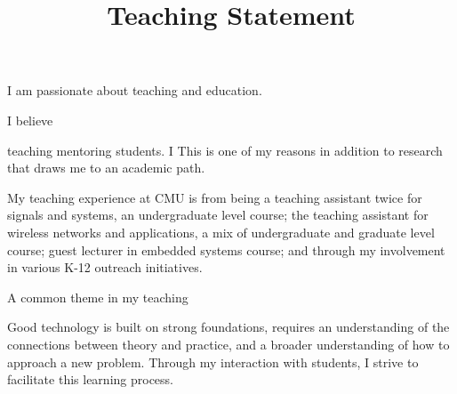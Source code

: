 \documentclass[10pt]{article}
\date{}
\begin{document}


\title{{\Large Teaching Statement}}
\vspace{-1em}
\maketitle

\vspace{-6em}


I am passionate about teaching and education. 



I believe 

 teaching
mentoring students. I This is one of my reasons in addition to research that draws me to an academic path. 

My teaching experience at CMU is from being a teaching assistant twice for signals and systems, an undergraduate level course; the teaching assistant for wireless networks and applications, a mix of undergraduate and graduate level course; guest lecturer in embedded systems course; and through my involvement in various K-12 outreach initiatives.

A common theme in my teaching 


Good technology is built on strong foundations, requires an understanding of the connections between theory and practice, and a broader understanding of how to approach a new problem.  Through my interaction with students, I strive to facilitate this learning process.
\end{document}
